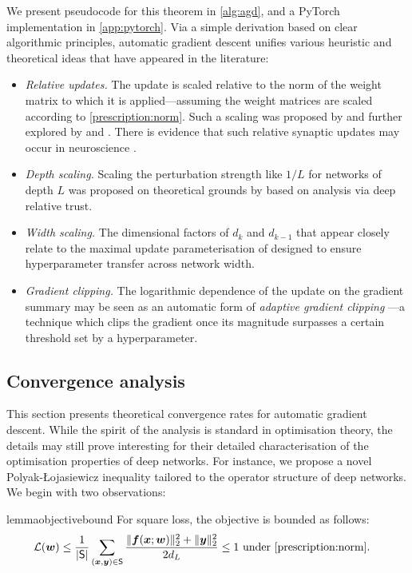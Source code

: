 We present pseudocode for this theorem in \cref{alg:agd}, and a PyTorch implementation in \cref{app:pytorch}. Via a simple derivation based on clear algorithmic principles, automatic gradient descent unifies various heuristic and theoretical ideas that have appeared in the literature:
\begin{itemize}[leftmargin=*]
    \item \textit{Relative updates.} The update is scaled relative to the norm of the weight matrix to which it is applied---assuming the weight matrices are scaled according to \cref{prescription:norm}. Such a scaling was proposed by \citet{You:EECS-2017-156} and further explored by \citet{carbonnelle2019layer} and \citet{my-fromage}. There is evidence that such relative synaptic updates may occur in neuroscience \citep{Loewenstein9481}.
    \item \textit{Depth scaling.} Scaling the perturbation strength like $1/L$ for networks of depth $L$ was proposed on theoretical grounds by \citet{my-fromage} based on analysis via deep relative trust.
    \item \textit{Width scaling.} The dimensional factors of $d_k$ and $d_{k-1}$ that appear closely relate to the maximal update parameterisation of \citet{Yang2021TensorPI} designed to ensure hyperparameter transfer across network width.
    \item \textit{Gradient clipping.} The logarithmic dependence of the update on the gradient summary may be seen as an automatic form of \textit{adaptive gradient clipping} \citep{pmlr-v139-brock21a}---a technique which clips the gradient once its magnitude surpasses a certain threshold set by a hyperparameter.
\end{itemize}

\subsection{Convergence analysis}

This section presents theoretical convergence rates for automatic gradient descent. While the spirit of the analysis is standard in optimisation theory, the details may still prove interesting for their detailed characterisation of the optimisation properties of deep networks. For instance, we propose a novel Polyak-Łojasiewicz inequality tailored to the operator structure of deep networks. We begin with two observations:

\begin{restatable}{lemma}{objectivebound}\label{lem:objectivebound}
For square loss, the objective is bounded as follows:
\begin{align*}
    \el(\vw) &\leq \frac{1}{\abs{\set{S}}} \sum_{(\vx,\vy)\in \set{S}}\frac{\norm{\vf(\vx;\vw)}_2^2 +\norm{\vy}_2^2}{2d_L} \leq 1 \text{ under \cref{prescription:norm}.}
\end{align*}
\end{restatable}

